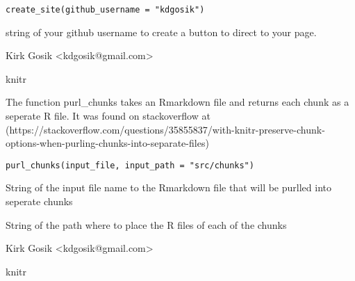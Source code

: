 \documentclass[letterpaper]{book}
\begin{document}
%
\begin{Usage}
\begin{verbatim}
create_site(github_username = "kdgosik")
\end{verbatim}
\end{Usage}
%
\begin{Arguments}
\begin{ldescription}
\item[\code{github\_username}] string of your github username to create a button to direct to your page.
\end{ldescription}
\end{Arguments}
%
\begin{Author}\relax
Kirk Gosik <kdgosik@gmail.com>
\end{Author}
%
\begin{SeeAlso}\relax
knitr
\end{SeeAlso}
%
\begin{Description}\relax
The function purl\_chunks takes an Rmarkdown file and returns each chunk as a
seperate R file.  It was found on stackoverflow at
(https://stackoverflow.com/questions/35855837/with-knitr-preserve-chunk-options-when-purling-chunks-into-separate-files)
\end{Description}
%
\begin{Usage}
\begin{verbatim}
purl_chunks(input_file, input_path = "src/chunks")
\end{verbatim}
\end{Usage}
%
\begin{Arguments}
\begin{ldescription}
\item[\code{input\_file}] String of the input file name to the Rmarkdown file that will be purlled into seperate chunks

\item[\code{input\_path}] String of the path where to place the R files of each of the chunks
\end{ldescription}
\end{Arguments}
%
\begin{Author}\relax
Kirk Gosik <kdgosik@gmail.com>
\end{Author}
%
\begin{SeeAlso}\relax
knitr
\end{SeeAlso}
\end{document}
